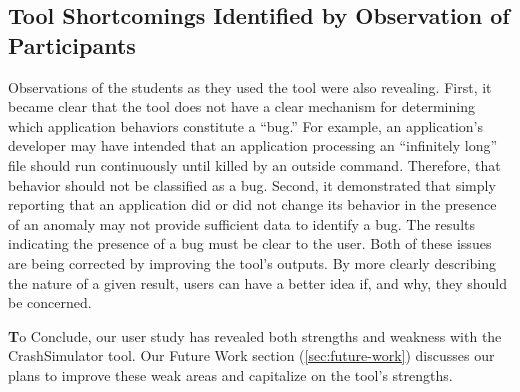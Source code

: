 \subsection{Tool Shortcomings Identified by Observation of Participants}
\label{subsec:tool-shortcomings}
Observations of the students as they used the tool were also revealing.
First,
it became clear that the tool
does not have a clear mechanism
for determining
which application behaviors constitute a ``bug.''
For example, an application's developer
may have intended that an application processing an ``infinitely long'' file should run continuously
until killed by an outside command.
Therefore, that behavior should not be classified as a bug.
Second,
it demonstrated that
simply reporting that an application did or did not change its behavior
in the presence of an anomaly may not provide sufficient data to identify a bug. The results indicating the presence of a bug must be clear to the user.
Both of these issues are being corrected
by improving the tool's outputs.
By more clearly describing
the nature of a given result,
users can have a better idea
if,
and why,
they should be concerned.

{\textbf To Conclude}, our user study has revealed both strengths and weakness
with the CrashSimulator tool.  Our Future Work section (\ref{sec:future-work})
discusses our plans to improve
these weak areas and capitalize on the tool's strengths.
